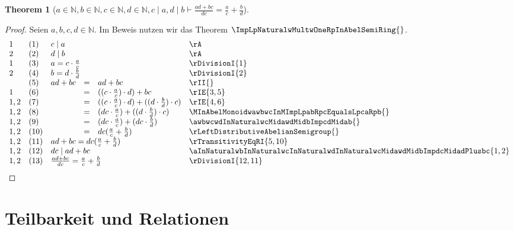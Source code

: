\documentclass{book}
\theoremstyle{plain}
\newtheorem{theorem}{Theorem}
\theoremstyle{remark}
\theoremstyle{definition}
\begin{document}
\label{aInNaturalwbInNaturalwcInNaturalwdInNaturalwcMidawdMidbImpLpadPlusbcRpDurchLpdcRpEqualsLpaRpDurchLpcRpPlusLpbRpDurchLpdRp}
\begin{theorem}[\(a\in\mathbb{N},b\in\mathbb{N}, c\in\mathbb{N}, d\in\mathbb{N},c\mid a, d\mid b\vdash \frac{ad+bc}{dc}=\frac{a}{c}+\frac{b}{d}\)]
\end{theorem}
\begin{proof}
Seien \(a,b,c,d\in\mathbb{N}\).
Im Beweis nutzen wir das Theorem \(\ImpLpNaturalwMultwOneRpInAbelSemiRing{}\). 
    \[
	\begin{array}{llclll}
    1       &  (1)  & \multicolumn{3}{l}{c\mid a} & \rA \\
    2       &  (2)  & \multicolumn{3}{l}{d\mid b} & \rA \\
    1       &  (3)  & \multicolumn{3}{l}{a=c\cdot \frac{a}{c}} & \rDivisionI{1} \\
    2       &  (4)  & \multicolumn{3}{l}{b=d\cdot \frac{b}{d}} & \rDivisionI{2} \\
            &  (5)  & ad+bc&=&ad+bc & \rII{} \\
    1       &  (6)  & &=&((c\cdot \frac{a}{c})\cdot d)+ bc & \rIE{3,5} \\
    1,2     &  (7)  & &=&((c\cdot \frac{a}{c})\cdot d)+((d\cdot \frac{b}{d})\cdot c) & \rIE{4,6} \\
    1,2     &  (8)  & &=&(dc\cdot \frac{a}{c})+((d\cdot \frac{b}{d})\cdot c) & \MInAbelMonoidwawbwcInMImpLpabRpcEqualsLpcaRpb{} \\
    1,2     &  (9)  & &=&(dc\cdot \frac{a}{c})+(dc\cdot \frac{b}{d}) & \awbwcwdInNaturalwcMidawdMidbImpcdMidab{} \\
    1,2     &  (10)  & &=&dc(\frac{a}{c}+\frac{b}{d}) & \rLeftDistributiveAbelianSemigroup{} \\
    1,2     &  (11) &\multicolumn{3}{l}{ad+bc=dc(\frac{a}{c}+\frac{b}{d})} & \rTransitivityEqRI{5,10} \\
    1,2     &  (12)  & \multicolumn{3}{l}{dc\mid ad+bc} & \aInNaturalwbInNaturalwcInNaturalwdInNaturalwcMidawdMidbImpdcMidadPlusbc{1,2} \\
    1,2     &  (13)  & \multicolumn{3}{l}{\frac{ad+bc}{dc}=\frac{a}{c}+\frac{b}{d}} & \rDivisionI{12,11} \\
    \end{array}
	\]
\end{proof}

\section{Teilbarkeit und Relationen}
\end{document}

